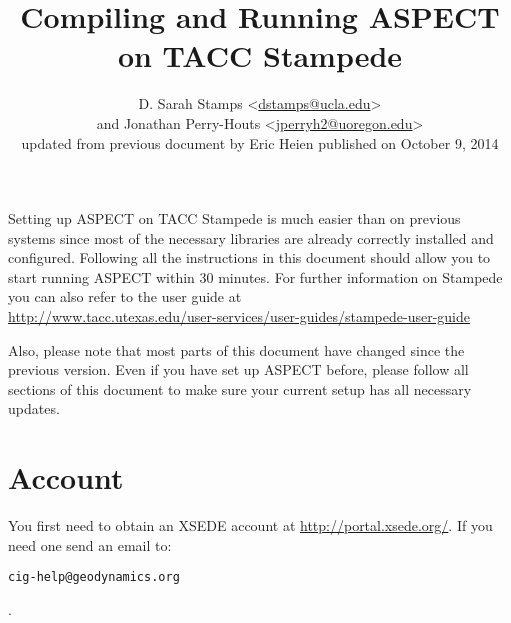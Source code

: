 \documentclass[12pt]{article}
\begin{document}
\title{Compiling and Running ASPECT on TACC Stampede}
\author{D. Sarah Stamps \textless\href{dstamps@ucla.edu}{dstamps@ucla.edu}\textgreater \\
and Jonathan Perry-Houts \textless\href{jperryh2@uoregon.edu}{jperryh2@uoregon.edu}\textgreater\\
updated from previous document by Eric Heien published on October 9, 2014}

\maketitle



Setting up ASPECT on TACC Stampede is much easier than on previous systems since
most of the necessary libraries are already correctly installed and configured. Following all
the instructions in this document should allow you to start running ASPECT within 30
minutes. For further information on Stampede you can also refer to the user guide at \\ 
\url{http://www.tacc.utexas.edu/user-services/user-guides/stampede-user-guide} 

Also, please note that most parts of this document have changed since the previous
version. Even if you have set up ASPECT before, please follow all sections of this document
to make sure your current setup has all necessary updates.


\section{Account}
You first need to obtain an XSEDE account at \url{http://portal.xsede.org/}. If you need one send an email to: \begin{alltt}\footnotesize cig-help@geodynamics.org\end{alltt}.  
\end{document}
